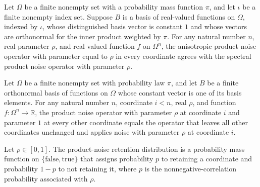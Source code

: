 \begin{theorem}
\label{FABL.anisotropicProductNoiseOperator_const}
\leanok
{}
Let $\Omega$ be a finite nonempty set with a probability mass function $\pi$, and let
$\iota$ be a finite nonempty index set. Suppose $B$ is a basis of real-valued functions
on $\Omega$, indexed by $\iota$, whose distinguished basis vector is constant $1$ and
whose vectors are orthonormal for the inner product weighted by $\pi$. For any natural
number $n$, real parameter $\rho$, and real-valued function $f$ on $\Omega^n$, the
anisotropic product noise operator with parameter equal to $\rho$ in every coordinate
agrees with the spectral product noise operator with parameter $\rho$.
\end{theorem}

\begin{theorem}
\label{FABL.anisotropicProductNoiseOperator_single}
\leanok
{}
Let $\Omega$ be a finite nonempty set with probability law $\pi$, and let $B$ be a
finite orthonormal basis of functions on $\Omega$ whose constant vector is one of its
basis elements. For any natural number $n$, coordinate $i<n$, real $\rho$, and function
$f:\Omega^n\to\mathbb R$, the product noise operator with parameter $\rho$ at coordinate
$i$ and parameter $1$ at every other coordinate equals the operator that leaves all
other coordinates unchanged and applies noise with parameter $\rho$ at coordinate $i$.
\end{theorem}

\begin{definition}
\label{FABL.productNoiseKeepPMF}
\leanok
{}
Let $\rho\in[0,1]$. The product-noise retention distribution is a probability mass
function on $\{\mathrm{false},\mathrm{true}\}$ that assigns probability $p$ to retaining
a coordinate and probability $1-p$ to not retaining it, where $p$ is the
nonnegative-correlation probability associated with $\rho$.
\end{definition}

